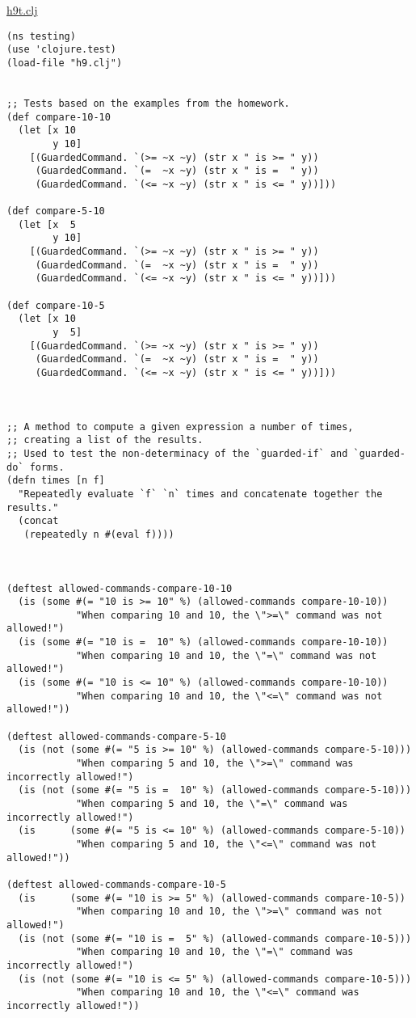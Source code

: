 \documentclass[11pt]{article}
\begin{document}
\href{./testing/h9/h9t.clj}{h9t.clj}
\begin{verbatim}
(ns testing)
(use 'clojure.test)
(load-file "h9.clj")


;; Tests based on the examples from the homework.
(def compare-10-10
  (let [x 10
        y 10]
    [(GuardedCommand. `(>= ~x ~y) (str x " is >= " y))
     (GuardedCommand. `(=  ~x ~y) (str x " is =  " y))
     (GuardedCommand. `(<= ~x ~y) (str x " is <= " y))]))

(def compare-5-10
  (let [x  5
        y 10]
    [(GuardedCommand. `(>= ~x ~y) (str x " is >= " y))
     (GuardedCommand. `(=  ~x ~y) (str x " is =  " y))
     (GuardedCommand. `(<= ~x ~y) (str x " is <= " y))]))

(def compare-10-5
  (let [x 10
        y  5]
    [(GuardedCommand. `(>= ~x ~y) (str x " is >= " y))
     (GuardedCommand. `(=  ~x ~y) (str x " is =  " y))
     (GuardedCommand. `(<= ~x ~y) (str x " is <= " y))]))



;; A method to compute a given expression a number of times,
;; creating a list of the results.
;; Used to test the non-determinacy of the `guarded-if` and `guarded-do` forms.
(defn times [n f]
  "Repeatedly evaluate `f` `n` times and concatenate together the results."
  (concat
   (repeatedly n #(eval f))))



(deftest allowed-commands-compare-10-10
  (is (some #(= "10 is >= 10" %) (allowed-commands compare-10-10))
            "When comparing 10 and 10, the \">=\" command was not allowed!")
  (is (some #(= "10 is =  10" %) (allowed-commands compare-10-10))
            "When comparing 10 and 10, the \"=\" command was not allowed!")
  (is (some #(= "10 is <= 10" %) (allowed-commands compare-10-10))
            "When comparing 10 and 10, the \"<=\" command was not allowed!"))

(deftest allowed-commands-compare-5-10
  (is (not (some #(= "5 is >= 10" %) (allowed-commands compare-5-10)))
            "When comparing 5 and 10, the \">=\" command was incorrectly allowed!")
  (is (not (some #(= "5 is =  10" %) (allowed-commands compare-5-10)))
            "When comparing 5 and 10, the \"=\" command was incorrectly allowed!")
  (is      (some #(= "5 is <= 10" %) (allowed-commands compare-5-10))
            "When comparing 5 and 10, the \"<=\" command was not allowed!"))

(deftest allowed-commands-compare-10-5
  (is      (some #(= "10 is >= 5" %) (allowed-commands compare-10-5))
            "When comparing 10 and 10, the \">=\" command was not allowed!")
  (is (not (some #(= "10 is =  5" %) (allowed-commands compare-10-5)))
            "When comparing 10 and 10, the \"=\" command was incorrectly allowed!")
  (is (not (some #(= "10 is <= 5" %) (allowed-commands compare-10-5)))
            "When comparing 10 and 10, the \"<=\" command was incorrectly allowed!"))


\end{verbatim}
\end{document}
